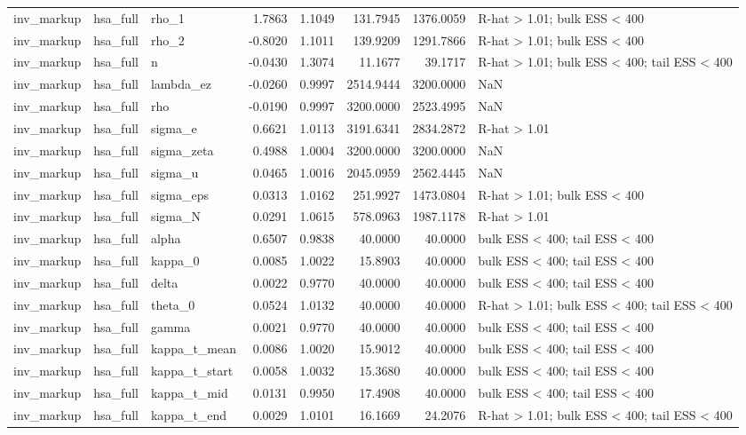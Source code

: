 \begin{tabular}{lllrrrrl}
inv\_markup & hsa\_full & rho\_1 & 1.7863 & 1.1049 & 131.7945 & 1376.0059 & R-hat > 1.01; bulk ESS < 400 \\
inv\_markup & hsa\_full & rho\_2 & -0.8020 & 1.1011 & 139.9209 & 1291.7866 & R-hat > 1.01; bulk ESS < 400 \\
inv\_markup & hsa\_full & n & -0.0430 & 1.3074 & 11.1677 & 39.1717 & R-hat > 1.01; bulk ESS < 400; tail ESS < 400 \\
inv\_markup & hsa\_full & lambda\_ez & -0.0260 & 0.9997 & 2514.9444 & 3200.0000 & NaN \\
inv\_markup & hsa\_full & rho & -0.0190 & 0.9997 & 3200.0000 & 2523.4995 & NaN \\
inv\_markup & hsa\_full & sigma\_e & 0.6621 & 1.0113 & 3191.6341 & 2834.2872 & R-hat > 1.01 \\
inv\_markup & hsa\_full & sigma\_zeta & 0.4988 & 1.0004 & 3200.0000 & 3200.0000 & NaN \\
inv\_markup & hsa\_full & sigma\_u & 0.0465 & 1.0016 & 2045.0959 & 2562.4445 & NaN \\
inv\_markup & hsa\_full & sigma\_eps & 0.0313 & 1.0162 & 251.9927 & 1473.0804 & R-hat > 1.01; bulk ESS < 400 \\
inv\_markup & hsa\_full & sigma\_N & 0.0291 & 1.0615 & 578.0963 & 1987.1178 & R-hat > 1.01 \\
inv\_markup & hsa\_full & alpha & 0.6507 & 0.9838 & 40.0000 & 40.0000 & bulk ESS < 400; tail ESS < 400 \\
inv\_markup & hsa\_full & kappa\_0 & 0.0085 & 1.0022 & 15.8903 & 40.0000 & bulk ESS < 400; tail ESS < 400 \\
inv\_markup & hsa\_full & delta & 0.0022 & 0.9770 & 40.0000 & 40.0000 & bulk ESS < 400; tail ESS < 400 \\
inv\_markup & hsa\_full & theta\_0 & 0.0524 & 1.0132 & 40.0000 & 40.0000 & R-hat > 1.01; bulk ESS < 400; tail ESS < 400 \\
inv\_markup & hsa\_full & gamma & 0.0021 & 0.9770 & 40.0000 & 40.0000 & bulk ESS < 400; tail ESS < 400 \\
inv\_markup & hsa\_full & kappa\_t\_mean & 0.0086 & 1.0020 & 15.9012 & 40.0000 & bulk ESS < 400; tail ESS < 400 \\
inv\_markup & hsa\_full & kappa\_t\_start & 0.0058 & 1.0032 & 15.3680 & 40.0000 & bulk ESS < 400; tail ESS < 400 \\
inv\_markup & hsa\_full & kappa\_t\_mid & 0.0131 & 0.9950 & 17.4908 & 40.0000 & bulk ESS < 400; tail ESS < 400 \\
inv\_markup & hsa\_full & kappa\_t\_end & 0.0029 & 1.0101 & 16.1669 & 24.2076 & R-hat > 1.01; bulk ESS < 400; tail ESS < 400 \\

\end{tabular}
